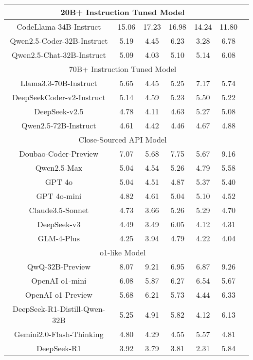 \documentclass[11pt, a4paper, logo, copyright, nonumbering, amsart]{map}
\begin{document}
\begin{CJK*}{UTF8}{gbsn}
\begin{table*}[h!]
\begin{adjustbox}{width=0.8\textwidth}
\begin{tabular}{c|cccccc}
    \midrule
    \multicolumn{6}{c}{20B+ Instruction Tuned Model} \\
    \midrule
    CodeLlama-34B-Instruct & 15.06 & 17.23 & 16.98 & 14.24 & 11.80 \\
    Qwen2.5-Coder-32B-Instruct & 5.19 & 4.45 & 6.23 & 3.28 & 6.78 \\
    Qwen2.5-Chat-32B-Instruct & 5.09 & 4.03 & 5.10 & 5.14 & 6.08 \\

    \midrule
    \multicolumn{6}{c}{70B+ Instruction Tuned Model} \\
    \midrule
    Llama3.3-70B-Instruct & 5.65 & 4.45 & 5.25 & 7.17 & 5.74 \\
    DeepSeekCoder-v2-Instruct & 5.14 & 4.59 & 5.23 & 5.50 & 5.22 \\
    DeepSeek-v2.5 & 4.78 & 4.11 & 4.63 & 5.27 & 5.08 \\
    Qwen2.5-72B-Instruct & 4.61 & 4.42 & 4.46 & 4.67 & 4.88 \\

    \midrule
    \multicolumn{6}{c}{Close-Sourced API Model} \\
    \midrule
    Doubao-Coder-Preview & 7.07 & 5.68 & 7.75 & 5.67 & 9.16 \\
    Qwen2.5-Max & 5.04 & 4.54 & 5.26 & 4.79 & 5.58 \\
    GPT 4o & 5.04 & 4.51 & 4.87 & 5.37 & 5.40 \\
    GPT 4o-mini & 4.82 & 4.61 & 5.04 & 5.10 & 4.52 \\
    Claude3.5-Sonnet & 4.73 & 3.66 & 5.26 & 5.29 & 4.70 \\
    DeepSeek-v3 & 4.49 & 3.49 & 6.05 & 4.12 & 4.31 \\
    GLM-4-Plus & 4.25 & 3.94 & 4.79 & 4.22 & 4.04 \\
    
    \midrule
    \multicolumn{6}{c}{o1-like Model} \\
    \midrule
    QwQ-32B-Preview & 8.07 & 9.21 & 6.95 & 6.87 & 9.26 \\
    OpenAI o1-mini & 6.08 & 5.87 & 6.27 & 6.54 & 5.67 \\
    OpenAI o1-Preview & 5.68 & 6.21 & 5.73 & 4.44 & 6.33 \\
    DeepSeek-R1-Distill-Qwen-32B & 5.25 & 4.91 & 5.82 & 4.12 & 6.13 \\
    Gemini2.0-Flash-Thinking & 4.80 & 4.29 & 4.55 & 5.57 & 4.81 \\
    DeepSeek-R1 & 3.92 & 3.79 & 3.81 & 2.31 & 5.84 \\
    \bottomrule
    \end{tabular}
    \end{adjustbox}
\end{table*}


\end{CJK*}
\end{document}
